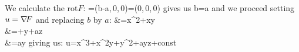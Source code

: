 \documentclass{article}
\begin{document}
{
We calculate the rot$F$:
\eq
{
=(b-a,\,0,\,0)=(0,\,0,\,0)
}
gives us 
\eq
{
b=a
}
and we proceed setting $u=\nabla\!F$ and replacing $b$ by $a$:
\eq
{
&=x^2+xy\\
&=+y+az\\
&=ay
}
giving us:
\eq
{
u=x^3+x^2y+y^2+ayz+\rm const
}
}
\end{document}

